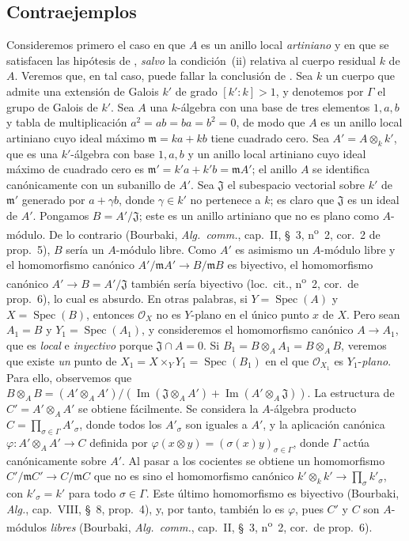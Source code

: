 \subsection{Contraejemplos}
\label{subsection:IV.11.7}

\begin{env}[11.7.1]
\label{IV.11.7.1}
Consideremos primero el caso en que $A$ es un anillo local \emph{artiniano} y en que se satisfacen las hipótesis de , \emph{salvo} la condición~(ii) relativa al cuerpo residual $k$ de $A$. Veremos que, en tal caso, puede fallar la conclusión de .
Sea $k$ un cuerpo que admite una extensión de Galois $k'$ de grado $[k':k]>1$, y denotemos por $\Gamma$ el grupo de Galois de $k'$.
Sea $A$ una $k$-álgebra con una base de tres elementos $1,a,b$ y tabla de multiplicación $a^2=ab=ba=b^2=0$, de modo que $A$ es un anillo local artiniano cuyo ideal máximo $\mathfrak m=ka+kb$ tiene cuadrado cero.
Sea $A'=A\otimes_k k'$, que es una $k'$-álgebra con base $1,a,b$ y un anillo local artiniano cuyo ideal máximo de cuadrado cero es $\mathfrak m'=k'a+k'b=\mathfrak m A'$; el anillo $A$ se identifica canónicamente con un subanillo de $A'$.
Sea $\mathfrak J$ el subespacio vectorial sobre $k'$ de $\mathfrak m'$ generado por $a+\gamma b$, donde $\gamma\in k'$ no pertenece a $k$; es claro que $\mathfrak J$ es un ideal de $A'$.
Pongamos $B=A'/\mathfrak J$; este es un anillo artiniano que no es plano como $A$-módulo. De lo contrario (Bourbaki, \emph{Alg.\ comm.}, cap.~II, \S~3, n\textsuperscript{o}~2, cor.~2 de prop.~5), $B$ sería un $A$-módulo libre. Como $A'$ es asimismo un $A$-módulo libre y el homomorfismo canónico $A'/\mathfrak m A'\to B/\mathfrak m B$ es biyectivo, el homomorfismo canónico $A'\to B=A'/\mathfrak J$ también sería
biyectivo (loc.~cit., n\textsuperscript{o}~2, cor.~de prop.~6), lo cual es absurdo. En otras palabras, si $Y=\operatorname{Spec}(A)$ y $X=\operatorname{Spec}(B)$, entonces $\mathcal O_X$ no es $Y$-plano en el único punto $x$ de $X$.
Pero sean $A_1=B$ y $Y_1=\operatorname{Spec}(A_1)$, y consideremos el homomorfismo canónico $A\to A_1$, que es \emph{local} e \emph{inyectivo} porque $\mathfrak J\cap A=0$. Si $B_1=B\otimes_A A_1=B\otimes_A B$, veremos que existe \emph{un} punto de $X_1=X\times_Y Y_1=\operatorname{Spec}(B_1)$ en el que $\mathcal O_{X_1}$ es $Y_1$-\emph{plano}.
Para ello, observemos que
$B\otimes_A B=(A'\otimes_A A')/(\operatorname{Im}(\mathfrak J\otimes_A A')+\operatorname{Im}(A'\otimes_A\mathfrak J))$.
La estructura de $C'=A'\otimes_A A'$ se obtiene fácilmente. Se considera la $A$-álgebra producto $C=\prod_{\sigma\in\Gamma}A'_{\sigma}$, donde todos los $A'_{\sigma}$ son iguales a $A'$, y la aplicación canónica $\varphi:A'\otimes_A A'\to C$ definida por $\varphi(x\otimes y)=(\sigma(x)y)_{\sigma\in\Gamma}$, donde $\Gamma$ actúa canónicamente sobre $A'$. Al pasar a los cocientes se obtiene un homomorfismo $C'/\mathfrak m C'\to C/\mathfrak m C$ que no es sino el homomorfismo canónico $k'\otimes_k k'\to\prod_{\sigma}k'_{\sigma}$, con $k'_{\sigma}=k'$ para todo $\sigma\in\Gamma$. Este último homomorfismo es biyectivo (Bourbaki, \emph{Alg.}, cap.~VIII, \S~8, prop.~4), y, por tanto, también lo es $\varphi$, pues $C'$ y $C$ son $A$-módulos \emph{libres} (Bourbaki, \emph{Alg.\ comm.}, cap.~II, \S~3, n\textsuperscript{o}~2, cor.~de prop.~6).

\end{env}
